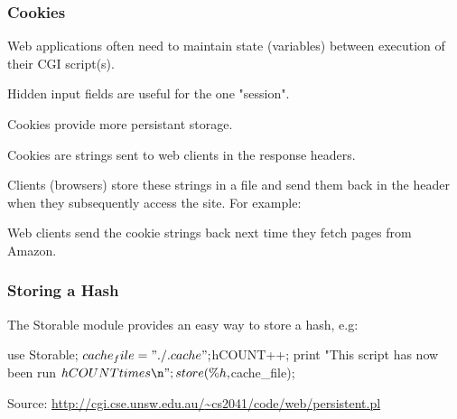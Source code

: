 \begin{frame}[fragile]
\frametitle{Cookies}
Web applications often need to maintain state (variables)
between execution of their CGI script(s).

Hidden input fields are useful for the one "session".

Cookies provide more persistant storage.

Cookies are strings sent to web clients in the response headers.

Clients (browsers) store these strings in a file and send them back in the header
when they subsequently access the site. For example:

{\tiny
{}
}
Web clients send the cookie strings back next time they fetch pages from Amazon.
\end{frame}

\begin{frame}[fragile]
\frametitle{Storing a Hash}
The Storable module provides an easy way to store a hash, e.g:

\begin{perl}
use Storable;
$cache_file = "./.cache";
$h{COUNT}++;
print "This script has now been run $h{COUNT} times\n";
store(\%h, $cache_file);
\end{perl}

{\tiny Source:  \href{http://cgi.cse.unsw.edu.au/~cs2041/code/web/persistent.pl}{http://cgi.cse.unsw.edu.au/{\textasciitilde}cs2041/code/web/persistent.pl}}

\end{frame}


